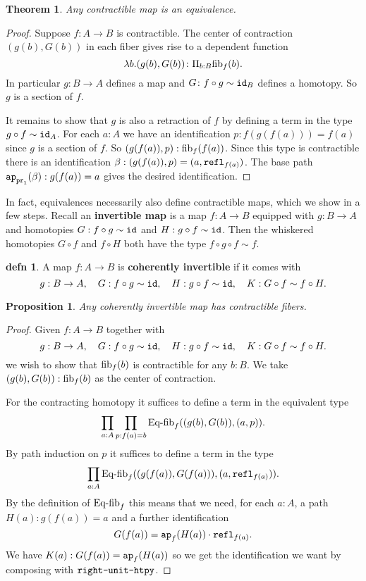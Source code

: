 \documentclass{amsart}
\theoremstyle{theorem}
\newtheorem*{thm}{Theorem}
\newtheorem*{prop}{Proposition}
\theoremstyle{definition}
\newtheorem*{defn}{defn}
\theoremstyle{remark}
\newcommand{\0}{\mathbbe{0}}
\newcommand{\1}{\mathbbe{1}}
\newcommand{\2}{\mathbbe{2}}
\newcommand{\3}{\mathbbe{3}}
\newcommand{\4}{\mathbbe{4}}
\newcommand{\term}[1]{{\textup{\texttt{#1}}}}
\newcommand{\type}[1]{{\textup{#1}}}
\newcommand{\id}{\term{id}}
\newcommand{\pr}{\term{pr}}
\newcommand{\refl}{\term{refl}}
\newcommand{\ap}{\term{ap}}
\newcommand{\fib}{\type{fib}}
\begin{document}
\begin{thm} Any contractible map is an equivalence.
\end{thm}
\begin{proof}
Suppose $f \colon A \to B$ is contractible. The center of contraction $(g(b),G(b))$ in each fiber gives rise to a dependent function
\[ \lambda b. (g(b),G(b)) \colon \Pi_{b:B} \fib_f(b).\]
In particular $g : B \to A$ defines a map and $G \colon f \circ g \sim \id_B$ defines a homotopy. So $g$ is a section of $f$.

It remains to show that $g$ is also a retraction of $f$ by defining a term in the type $g \circ f \sim \id_A$. For each $a : A$ we have an identification $p : f(g(f(a))) = f(a)$ since $g$ is a section of $f$. So $(g(f(a)),p) : \fib_f(f(a))$. Since this type is contractible there is an identification $\beta : (g(f(a)),p) = (a, \refl_{f(a)})$. The base path $\ap_{\pr_1}(\beta) : g(f(a)) = a$ gives the desired identification.
\end{proof}

In fact, equivalences necessarily also define contractible maps, which we show in a few steps. Recall an \textbf{invertible map} is a map $f \colon A \to B$ equipped with $g \colon B \to A$ and homotopies $G : f \circ g \sim \id$ and $H : g \circ f \sim \id$. Then the whiskered homotopies $G \circ f$ and $f \circ H$ both have the type $f \circ g \circ f \sim f$.

\begin{defn} A map $f \colon A \to B$ is \textbf{coherently invertible} if it comes with
\[ g : B \to A, \quad G : f \circ g \sim \id, \quad H : g \circ f \sim \id, \quad K : G \circ f \sim f \circ H.\]
\end{defn}

\begin{prop} Any coherently invertible map has contractible fibers.
\end{prop}
\begin{proof}
Given $f \colon A \to B$ together with
\[ g : B \to A, \quad G : f \circ g \sim \id, \quad H : g \circ f \sim \id, \quad K : G \circ f \sim f \circ H.\]
we wish to show that $\fib_f(b)$ is contractible for any $b : B$. We take $(g(b), G(b)) : \fib_f(b)$ as the center of contraction. 

For the contracting homotopy it suffices to define a term in the equivalent type
\[ \prod_{a :A} \prod_{p : f(a) = b} \type{Eq-fib}_f((g(b),G(b)), (a,p)).\]
By path induction on $p$ it suffices to define a term in the type
\[ \prod_{a :A} \type{Eq-fib}_f((g(f(a)),G(f(a))),(a, \refl_{f(a)})).\]
By the definition of $\type{Eq-fib}_f$ this means that we need, for each $a:A$, a path $H(a) : g(f(a))=a$ and a further identification
\[ G(f(a)) = \ap_f(H(a)) \cdot \refl_{f(a)}.\]
We have $K(a) : G(f(a)) = \ap_f(H(a))$ so we get the identification we want by composing with $\term{right-unit-htpy}$.\end{proof}
\end{document}
